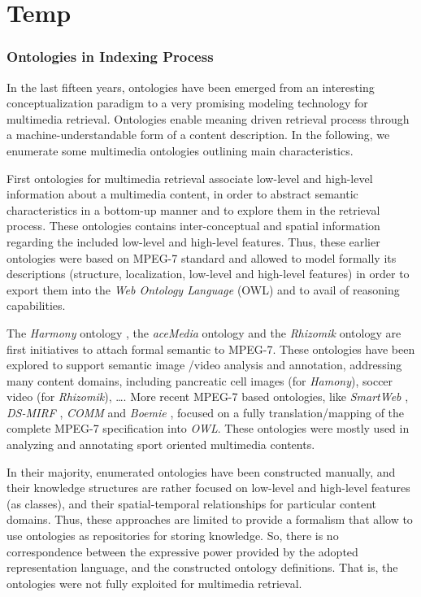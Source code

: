 \chapter{Temp}

		\subsection{Ontologies in Indexing Process}
		In the last fifteen years, ontologies have been emerged from an interesting conceptualization paradigm 
		to a very promising modeling technology for multimedia retrieval. Ontologies enable meaning driven 
		retrieval process through a machine-understandable form of a content description. 
		In the following, we enumerate some multimedia ontologies outlining main characteristics.
		
		First ontologies for multimedia retrieval associate low-level and high-level information about a multimedia content, 
		in order to abstract semantic characteristics in a bottom-up manner and to explore them in the retrieval process. 
		These ontologies contains inter-conceptual and spatial information regarding the included low-level and high-level 
		features. Thus, these earlier ontologies were based on MPEG-7 standard and allowed to model formally its descriptions 
		(structure, localization, low-level and high-level features) in order to export them into the \emph{Web Ontology Language} 
		(OWL) \citep{Staab2009} and to avail of reasoning capabilities.
		
		The \emph{Harmony} ontology \citep{Hunter2001}, the \emph{aceMedia} ontology \citep{ Petridis2004} and the 
		\emph{Rhizomik} \citep{Garcia2005}  ontology are first initiatives to attach formal semantic to MPEG-7. 
		These ontologies have been explored to support semantic image /video analysis and annotation, addressing 
		many content domains, including pancreatic cell images  (for \emph{Hamony}),  soccer video 
		(for \emph{Rhizomik}), \dots.  More recent MPEG-7 based ontologies, like \emph{SmartWeb} 
		\citep{Oberle2007}, \emph{DS-MIRF} \citep{Tsinaraki2007}, \emph{COMM} \citep{Arndt2007} and 
		\emph{Boemie} \citep{Dasiopoulou2009}, focused on a fully translation/mapping of the complete 
		MPEG-7 specification into \emph{OWL}. These ontologies were mostly used in analyzing and annotating 
		sport oriented multimedia contents.
		
		In their majority, enumerated ontologies have been constructed manually, and their knowledge structures are
		rather focused on low-level and high-level features (as classes), and their spatial-temporal relationships
		for particular content domains. Thus, these approaches are limited to provide a formalism that allow to use 
		ontologies as repositories for storing knowledge. So, there is no correspondence between the expressive power
		provided by the adopted representation language, and the constructed ontology definitions. 
		That is, the ontologies were not fully exploited for multimedia retrieval.
		
